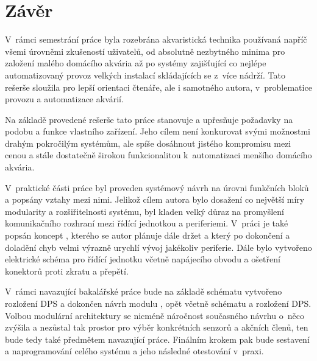 \chapter*{Závěr}
{}

V~rámci semestrání práce byla rozebrána akvaristická technika používaná napříč všemi úrovněmi zkušeností uživatelů, od absolutně nezbytného minima pro založení malého domácího akvária až po systémy zajišťující co nejlépe automatizovaný provoz velkých instalací skládajících se z~více nádrží. Tato rešerše sloužila pro lepší orientaci čtenáře, ale i samotného autora, v~problematice provozu a automatizace akvárií. 

Na základě provedené rešerše tato práce stanovuje a upřesňuje požadavky na podobu a funkce vlastního zařízení. Jeho cílem není konkurovat svými možnostmi drahým pokročilým systémům, ale spíše dosáhnout jistého kompromisu mezi cenou a stále dostatečně širokou funkcionalitou k~automatizaci menšího domácího akvária.

V~praktické části práce byl proveden systémový návrh na úrovni funkčních bloků a popsány vztahy mezi nimi. Jelikož cílem autora bylo dosažení co největší míry modularity a rozšiřitelnosti systému, byl kladen velký důraz na promyšlení komunikačního rozhraní mezi řídící jednotkou a periferiemi. V~práci je také popsán koncept , kterého se autor plánuje dále držet a který po dokončení a doladění chyb velmi výrazně urychlí vývoj jakékoliv periferie. Dále bylo vytvořeno elektrické schéma pro řídící jednotku včetně napájecího obvodu a ošetření konektorů proti zkratu a přepětí. 

V~rámci navazující bakalářské práce bude na základě schématu vytvořeno rozložení DPS a dokončen návrh modulu , opět včetně schématu a rozložení DPS. Volbou modulární architektury se nicméně náročnost současného návrhu o~něco zvýšila a nezůstal tak prostor pro výběr konkrétních senzorů a akčních členů, ten bude tedy také předmětem navazující práce. Finálním krokem pak bude sestavení a naprogramování celého systému a jeho následné otestování v~praxi.
